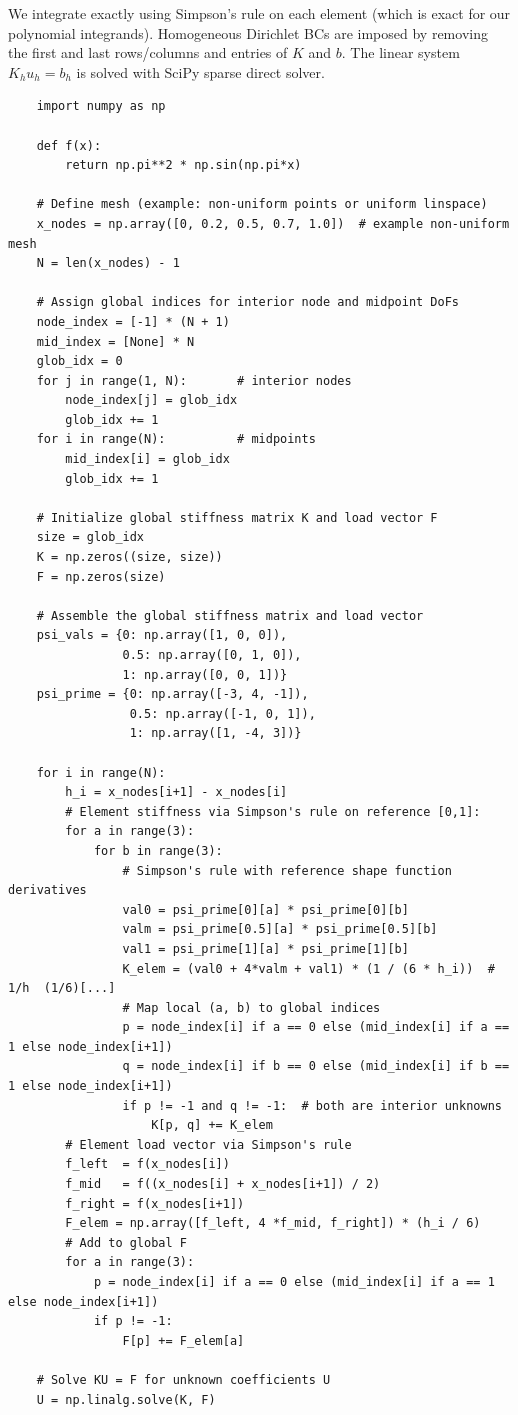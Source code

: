 \documentclass{article}
\begin{document}
We integrate exactly using Simpson's rule on each element (which is exact for our polynomial integrands). Homogeneous Dirichlet BCs are imposed by removing the first and last rows/columns and entries of $K$ and $b$. The linear system $K_{h}u_h = b_{h}$ is solved with SciPy sparse direct solver.
\begin{verbatim}
	import numpy as np
	
	def f(x):
		return np.pi**2 * np.sin(np.pi*x)
	
	# Define mesh (example: non-uniform points or uniform linspace)
	x_nodes = np.array([0, 0.2, 0.5, 0.7, 1.0])  # example non-uniform mesh
	N = len(x_nodes) - 1
	
	# Assign global indices for interior node and midpoint DoFs
	node_index = [-1] * (N + 1)
	mid_index = [None] * N
	glob_idx = 0
	for j in range(1, N):       # interior nodes
		node_index[j] = glob_idx
		glob_idx += 1
	for i in range(N):          # midpoints
		mid_index[i] = glob_idx
		glob_idx += 1
	
	# Initialize global stiffness matrix K and load vector F
	size = glob_idx
	K = np.zeros((size, size))
	F = np.zeros(size)
	
	# Assemble the global stiffness matrix and load vector
	psi_vals = {0: np.array([1, 0, 0]),
				0.5: np.array([0, 1, 0]),
				1: np.array([0, 0, 1])}
	psi_prime = {0: np.array([-3, 4, -1]),
				 0.5: np.array([-1, 0, 1]),
				 1: np.array([1, -4, 3])}
	
	for i in range(N):
		h_i = x_nodes[i+1] - x_nodes[i]
		# Element stiffness via Simpson's rule on reference [0,1]:
		for a in range(3):
			for b in range(3):
				# Simpson's rule with reference shape function derivatives
				val0 = psi_prime[0][a] * psi_prime[0][b]
				valm = psi_prime[0.5][a] * psi_prime[0.5][b]
				val1 = psi_prime[1][a] * psi_prime[1][b]
				K_elem = (val0 + 4*valm + val1) * (1 / (6 * h_i))  # 1/h  (1/6)[...]
				# Map local (a, b) to global indices
				p = node_index[i] if a == 0 else (mid_index[i] if a == 1 else node_index[i+1])
				q = node_index[i] if b == 0 else (mid_index[i] if b == 1 else node_index[i+1])
				if p != -1 and q != -1:  # both are interior unknowns
					K[p, q] += K_elem
		# Element load vector via Simpson's rule
		f_left  = f(x_nodes[i])
		f_mid   = f((x_nodes[i] + x_nodes[i+1]) / 2)
		f_right = f(x_nodes[i+1])
		F_elem = np.array([f_left, 4 *f_mid, f_right]) * (h_i / 6)
		# Add to global F
		for a in range(3):
			p = node_index[i] if a == 0 else (mid_index[i] if a == 1 else node_index[i+1])
			if p != -1:
				F[p] += F_elem[a]
	
	# Solve KU = F for unknown coefficients U
	U = np.linalg.solve(K, F)
	\end{verbatim}
\end{document}

